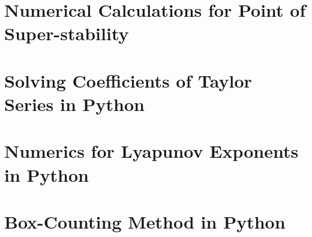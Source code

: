 \documentclass[12pt,oneside]{report}
\begin{document}
\begin{appendices}
	\chapter{Numerical Calculations for Point of Super-stability}
	
    \chapter{Solving Coefficients of Taylor Series in Python}
	
    \chapter{Numerics for Lyapunov Exponents in Python}
    
    \chapter{Box-Counting Method in Python}
    
\end{appendices}

%  
\printbibliography
{}
\end{document}
